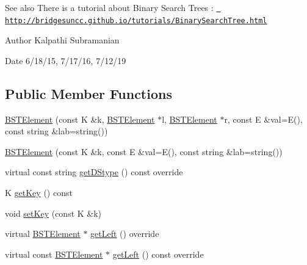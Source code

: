 \begin{DoxySeeAlso}{See also}
There is a tutorial about Binary Search Trees \+: \href{http://bridgesuncc.github.io/tutorials/BinarySearchTree.html}{\texttt{ http\+://bridgesuncc.\+github.\+io/tutorials/\+Binary\+Search\+Tree.\+html}}
\end{DoxySeeAlso}
\begin{DoxyAuthor}{Author}
Kalpathi Subramanian 
\end{DoxyAuthor}
\begin{DoxyDate}{Date}
6/18/15, 7/17/16, 7/12/19 
\end{DoxyDate}
\subsection*{Public Member Functions}
\begin{DoxyCompactItemize}
\item 
\mbox{\hyperlink{classbridges_1_1datastructure_1_1_b_s_t_element_a861caf985c223a9a848082fd5a4974fd}{B\+S\+T\+Element}} (const K \&k, \mbox{\hyperlink{classbridges_1_1datastructure_1_1_b_s_t_element}{B\+S\+T\+Element}} $\ast$l, \mbox{\hyperlink{classbridges_1_1datastructure_1_1_b_s_t_element}{B\+S\+T\+Element}} $\ast$r, const E \&val=E(), const string \&lab=string())
\item 
\mbox{\hyperlink{classbridges_1_1datastructure_1_1_b_s_t_element_a839372e61dd261d3fd7df1d22dd0a5dd}{B\+S\+T\+Element}} (const K \&k, const E \&val=E(), const string \&lab=string())
\item 
virtual const string \mbox{\hyperlink{classbridges_1_1datastructure_1_1_b_s_t_element_a2bb8cc9ec4b6bc5b89ecef0f17be366f}{get\+D\+Stype}} () const override
\item 
K \mbox{\hyperlink{classbridges_1_1datastructure_1_1_b_s_t_element_a66bd1d5874e4e0c8048e03e5fff07f86}{get\+Key}} () const
\item 
void \mbox{\hyperlink{classbridges_1_1datastructure_1_1_b_s_t_element_a06d80480736ae19052e2d1bc6345323a}{set\+Key}} (const K \&k)
\item 
virtual \mbox{\hyperlink{classbridges_1_1datastructure_1_1_b_s_t_element}{B\+S\+T\+Element}} $\ast$ \mbox{\hyperlink{classbridges_1_1datastructure_1_1_b_s_t_element_af863c624691c11db26ae3b6d723d1f5c}{get\+Left}} () override
\item 
virtual const \mbox{\hyperlink{classbridges_1_1datastructure_1_1_b_s_t_element}{B\+S\+T\+Element}} $\ast$ \mbox{\hyperlink{classbridges_1_1datastructure_1_1_b_s_t_element_abac324ef0b480420bd82ecfe4501d60d}{get\+Left}} () const override

\end{DoxyCompactItemize}
